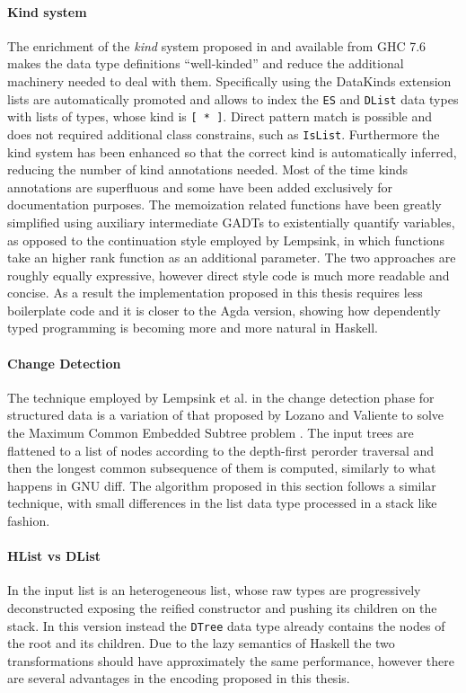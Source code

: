 \documentclass[../Thesis.tex]{subfiles}
\begin{document}
	\paragraph{Kind system}
	The enrichment of the \emph{kind} system proposed in
	\cite{Yorgey12} and available from GHC 7.6
	makes the data type definitions ``well-kinded''
	and reduce the additional machinery needed to deal with them.
	Specifically using the DataKinds extension lists are 
	automatically promoted and allows to index the \texttt{ES}
	and \texttt{DList} data types with lists of types, whose kind is 
	\texttt{[ * ]}.
	Direct pattern match is possible and does not required 
	additional class constrains, such as \texttt{IsList}.
	Furthermore the kind system has been enhanced so that
	the correct kind is automatically inferred, reducing the number
	of kind annotations needed. Most of the time kinds 
	annotations are superfluous and some have been
	added exclusively for documentation purposes.
	The memoization related functions have been greatly 
	simplified using auxiliary intermediate GADTs to
	existentially quantify variables, as opposed to the continuation
	style employed by  Lempsink, in which functions take
	an higher rank function as an additional parameter.
	The two approaches are roughly equally expressive, however
	direct style code is much more readable and concise.
	As a result the implementation proposed in this thesis 
	requires less boilerplate code and it is closer to the
	Agda version, showing how dependently typed programming
	is becoming more and more natural in Haskell.

	\paragraph{Change Detection}
	The technique employed by Lempsink et al. in the 
	change detection phase for structured data is a variation of
	that proposed by Lozano and Valiente to solve the
	Maximum Common Embedded Subtree problem \cite{Lozano}.
	The input trees are flattened to a list of nodes according to the 
	depth-first perorder traversal and then the longest common
	subsequence of them is computed, similarly to what happens
	in GNU diff. The algorithm proposed in this section follows
	a similar technique, with small differences in the list data type 
	processed in a stack like fashion.

	\paragraph{HList vs DList}	
	In \cite{Lemp09} the input list is an heterogeneous list, whose 
	raw types are progressively deconstructed exposing the 
	reified constructor and pushing its	children on the stack. In this version instead the \texttt{DTree} data type already contains
	the nodes of the root and its children.
	Due to the lazy semantics of Haskell 
	the two transformations should have approximately the same performance,		
	however there are several advantages in the encoding proposed in this
	thesis.
	
\end{document}
